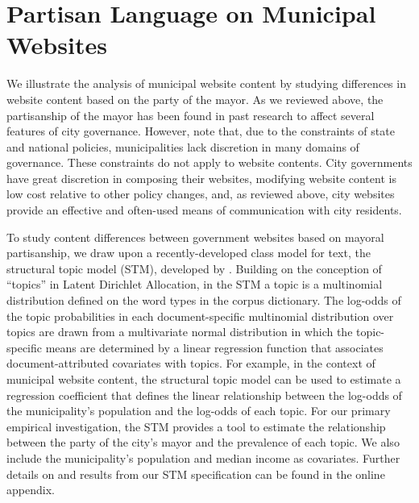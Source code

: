 \documentclass[11pt]{article}
\begin{document}
\section{Partisan Language on Municipal Websites}

We illustrate the analysis of municipal website content by studying differences in website content based on the party of the mayor. As we reviewed above, the partisanship of the mayor has been found in past research to affect several features of city governance. However, \citet{gerber2011mayors} note that, due to the constraints of state and national policies, municipalities lack discretion in many domains of governance. These constraints do not apply to website contents. City governments have great discretion in composing their websites, modifying website content is low cost relative to other policy changes, and, as reviewed above, city websites provide an effective and often-used means of communication with city residents. 



%

To study content differences between government websites based on mayoral partisanship, we draw upon a recently-developed class model for text, the structural topic model (STM), developed by \citet{Roberts2014}. Building on the conception of ``topics'' in Latent Dirichlet Allocation, in the STM a topic is a multinomial distribution defined on the word types in the corpus dictionary. The log-odds of the topic probabilities in each document-specific multinomial distribution over topics are drawn from a multivariate normal distribution in which the topic-specific means are determined by a linear regression function that associates document-attributed covariates with topics. For example, in the context of municipal website content, the structural topic model can be used to estimate a regression coefficient that defines the linear relationship between the log-odds of the municipality's population and the log-odds of each topic. For our primary empirical investigation, the STM provides a tool to estimate the relationship between the party of the city's mayor and the prevalence of each topic. We also include the municipality's population and median income as covariates. Further details on and results from our STM specification can be found in the online appendix.
\end{document}
